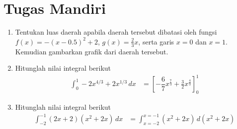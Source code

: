 	\section{Tugas Mandiri}
\begin{enumerate}
	\item Tentukan luas daerah apabila daerah tersebut dibatasi oleh fungsi $ {\displaystyle f(x)=-(x-0.5)^2+2 }$, $ {\displaystyle g(x)=\frac{2}{3}x}$, serta garis $ x=0 $ dan $ x=1 $. Kemudian gambarkan grafik dari daerah tersebut.%
	\item Hitunglah nilai integral berikut%
	\begin{align*}
		\int_{0}^{1}-2x^{4/3} + 2x^{1/3} \,dx &= \left[-\dfrac{6}{7}x^{\frac{7}{3}}+\frac{3}{2}x^{\frac{4}{3}} \right]_{0}^{1}
	\end{align*} 
	\item Hitunglah nilai integral berikut\\ %
	\begin{align*}
		\int_{-2}^{-1}(2x+2)(x^2+2x) \,dx  &= \int_{x=-2}^{x=-1}(x^2+2x) \,d(x^2+2x)
	\end{align*} 
\end{enumerate}